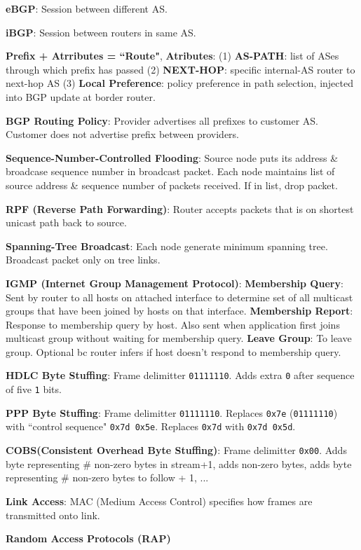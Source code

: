 \documentclass{scrartcl}
\begin{document}
\begin{multicols*}{3}
{\bf eBGP}: Session between different AS.

{\bf iBGP}: Session between routers in same AS.

{\bf Prefix + Atrributes = ``Route"}, {\bf Atributes}: (1) {\bf AS-PATH}: list of ASes through which prefix has passed (2) {\bf NEXT-HOP}: specific internal-AS router to next-hop AS (3) {\bf Local Preference}: policy preference in path selection, injected into BGP update at border router.

{\bf BGP Routing Policy}: Provider advertises all prefixes to customer AS. Customer does not advertise prefix between providers.


{\bf Sequence-Number-Controlled Flooding}: Source node puts its address \& broadcase sequence number in broadcast packet. Each node maintains list of source address \& sequence number of packets received. If in list, drop packet.

{\bf RPF (Reverse Path Forwarding)}: Router accepts packets that is on shortest unicast path back to source.

{\bf Spanning-Tree Broadcast}: Each node generate minimum spanning tree. Broadcast packet only on tree links.


{\bf IGMP (Internet Group Management Protocol)}: {\bf Membership Query}: Sent by router to all hosts on attached interface to determine set of all multicast groups that have been joined by hosts on that interface. {\bf Membership Report}: Response to membership query by host. Also sent when application first joins multicast group without waiting for membership query. {\bf Leave Group}: To leave group. Optional bc router infers if host doesn't respond to membership query.


{\bf HDLC Byte Stuffing}: Frame delimitter \texttt{01111110}. Adds extra \texttt{0} after sequence of five \texttt{1} bits.

{\bf PPP Byte Stuffing}: Frame delimitter \texttt{01111110}. Replaces \texttt{0x7e} (\texttt{01111110}) with ``control sequence" \texttt{0x7d 0x5e}. Replaces \texttt{0x7d} with \texttt{0x7d 0x5d}.

{\bf COBS(Consistent Overhead Byte Stuffing)}: Frame delimitter \texttt{0x00}. Adds byte representing \# non-zero bytes in stream+1, adds non-zero bytes, adds byte representing \# non-zero bytes to follow + 1, ...

{\bf Link Access}: MAC (Medium Access Control) specifies how frames are transmitted onto link.

{\bf Random Access Protocols (RAP)}


\end{multicols*}
\end{document}
